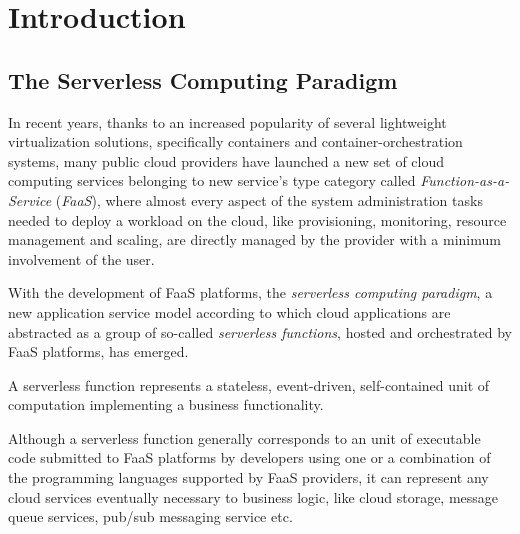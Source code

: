\documentclass[12pt,a4paper]{report}
\begin{document}
	
\begin{frontespizio} 
\end{frontespizio} 
	
	
\tableofcontents

\chapter{Introduction}

\section{The Serverless Computing Paradigm}

In recent years, thanks to an increased popularity of several lightweight virtualization solutions, specifically containers and container-orchestration systems, many public cloud providers have launched a new set of cloud computing services belonging to new service's type category called \textit{Function-as-a-Service} (\textit{FaaS}), where almost every aspect of the system administration tasks needed to deploy a workload on the cloud, like provisioning, monitoring, resource management and scaling, are directly managed by the provider with a minimum involvement of the user.

With the development of FaaS platforms, the \textit{serverless computing paradigm}, a new application service model according to which cloud applications are abstracted as a group of so-called \textit{serverless functions}, hosted and orchestrated by FaaS platforms, has emerged. 

A serverless function represents a stateless, event-driven, self-contained unit of computation implementing a business functionality.

Although a serverless function generally corresponds to an unit of executable code submitted to FaaS platforms by developers using one or a combination of the programming languages supported by FaaS providers, it can represent any cloud services eventually necessary to business logic, like cloud storage, message queue services, pub/sub messaging service etc.
\end{document}
